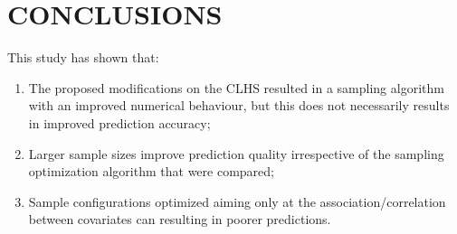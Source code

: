 \section{CONCLUSIONS}

This study has shown that:

\begin{enumerate}[label = (\Roman*)]
\item The proposed modifications on the CLHS resulted in a sampling algorithm with an improved numerical 
behaviour, but this does not necessarily results in improved prediction accuracy;

\item Larger sample sizes improve prediction quality irrespective of the sampling optimization algorithm that
were compared;

\item Sample configurations optimized aiming only at the association/correlation between covariates can 
resulting in poorer predictions.
\end{enumerate}
